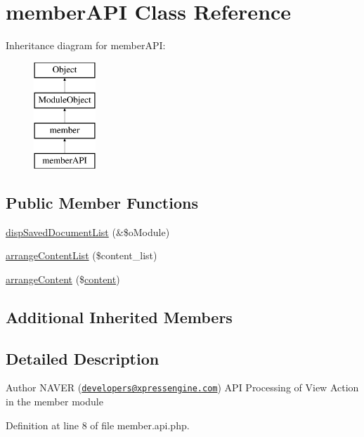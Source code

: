 \hypertarget{classmemberAPI}{\section{member\+A\+P\+I Class Reference}
\label{classmemberAPI}
}
Inheritance diagram for member\+A\+P\+I\+:\begin{figure}[H]
\begin{center}
\leavevmode
\includegraphics[height=4.000000cm]{classmemberAPI}
\end{center}
\end{figure}
\subsection*{Public Member Functions}
\begin{DoxyCompactItemize}
\item 
\hyperlink{classmemberAPI_ab5fd91bb448c7ba48304a12965b81a54}{disp\+Saved\+Document\+List} (\&\$o\+Module)
\item 
\hyperlink{classmemberAPI_accb093980616ddbea40361249379a01b}{arrange\+Content\+List} (\$content\+\_\+list)
\item 
\hyperlink{classmemberAPI_a2f05be1a71de779b38ea5c0e113969ea}{arrange\+Content} (\$\hyperlink{classcontent}{content})
\end{DoxyCompactItemize}
\subsection*{Additional Inherited Members}


\subsection{Detailed Description}
\begin{DoxyAuthor}{Author}
N\+A\+V\+E\+R (\href{mailto:developers@xpressengine.com}{\tt developers@xpressengine.\+com}) A\+P\+I Processing of View Action in the member module 
\end{DoxyAuthor}


Definition at line 8 of file member.\+api.\+php.



